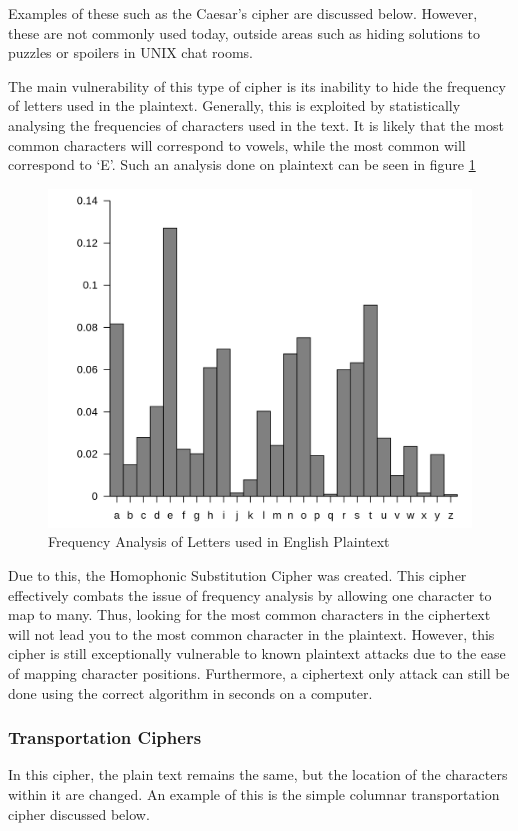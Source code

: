 				Examples of these such as the Caesar's cipher are discussed below. 
				However, these are not commonly used today, outside areas such as hiding solutions to puzzles or spoilers in UNIX chat rooms. 

				The main vulnerability of this type of cipher is its inability to hide the frequency of letters used in the plaintext. 
				Generally, this is exploited by statistically analysing the frequencies of characters used in the text. 
				It is likely that the most common characters will correspond to vowels, while the most common will correspond to `E'. 
				Such an analysis done on plaintext can be seen in figure \ref{fig:LetterFreq}
				\begin{figure}[htb]
					\centering
					\includegraphics[scale=0.2]{./letterFreq.png}
					\caption{Frequency Analysis of Letters used in English Plaintext}
					\label{fig:LetterFreq}
				\end{figure}

				Due to this, the Homophonic Substitution Cipher was created. 
				This cipher effectively combats the issue of frequency analysis by allowing one character to map to many. 
				Thus, looking for the most common characters in the ciphertext will not lead you to the most common character in the plaintext. 
				However, this cipher is still exceptionally vulnerable to known plaintext attacks due to the ease of mapping character positions. 
				Furthermore, a ciphertext only attack can still be done using the correct algorithm in seconds on a computer. 
			\subsubsection{Transportation Ciphers}
				In this cipher, the plain text remains the same, but the location of the characters within it are changed. 
				An example of this is the simple columnar transportation cipher discussed below. 

